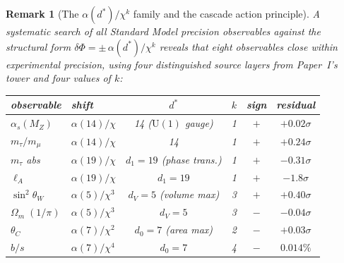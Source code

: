 \documentclass[12pt,a4paper]{article}
\newtheorem*{remark}{Remark}
\begin{document}
\begin{remark}[The $\alpha(d^*)/\chi^k$ family and the cascade action principle]\label{rem:phase-family}
A systematic search of all Standard Model precision observables against the structural form $\delta\Phi = \pm\,\alpha(d^*)/\chi^k$ reveals that \emph{eight} observables close within experimental precision, using four distinguished source layers from Paper~I's tower and four values of $k$:

\begin{center}
\renewcommand{\arraystretch}{1.35}
\begin{tabular}{llcccc}
\toprule
observable & shift & $d^*$ & $k$ & sign & residual \\
\midrule
$\alpha_s(M_Z)$    & $\alpha(14)/\chi$    & 14 ($\mathrm{U}(1)$ gauge) & 1 & $+$ & $+0.02\sigma$ \\
$m_\tau/m_\mu$      & $\alpha(14)/\chi$    & 14   & 1 & $+$ & $+0.24\sigma$ \\
$m_\tau$ abs        & $\alpha(19)/\chi$    & $d_1{=}19$ (phase trans.)  & 1 & $+$ & $-0.31\sigma$ \\
$\ell_A$            & $\alpha(19)/\chi$    & $d_1{=}19$ & 1 & $+$ & $-1.8\sigma$ \\
$\sin^2\theta_W$   & $\alpha(5)/\chi^3$   & $d_V{=}5$ (volume max)     & 3 & $+$ & $+0.40\sigma$ \\
$\Omega_m\;(1/\pi)$ & $\alpha(5)/\chi^3$  & $d_V{=}5$  & 3 & $-$ & $-0.04\sigma$ \\
$\theta_C$          & $\alpha(7)/\chi^2$   & $d_0{=}7$ (area max)       & 2 & $-$ & $+0.03\sigma$ \\
$b/s$               & $\alpha(7)/\chi^4$   & $d_0{=}7$  & 4 & $-$ & $0.014\%$ \\
\bottomrule
\end{tabular}
\end{center}


\end{remark}
\end{document}
